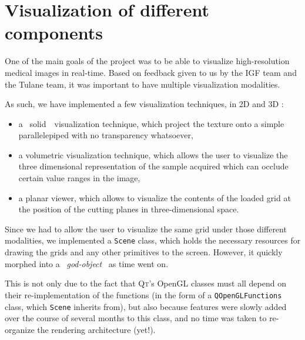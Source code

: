 \section{Visualization of different components}\label{text:03_software_components:02_visualization}
{
	One of the main goals of the project was to be able to visualize high-resolution medical images in real-time. Based on feedback given to us by the IGF team and the Tulane team, it was important to have multiple visualization modalities.\par
	As such, we have implemented a few visualization techniques, in 2D and 3D :\begin{itemize}
		\item a \guillemotleft{}~solid~\guillemotright{}~visualization technique, which project the texture onto a simple parallelepiped with no transparency whatsoever,
		\item a volumetric visualization technique, which allows the user to visualize the three dimensional representation of the sample acquired which can occlude certain value ranges in the image,
		\item a planar viewer, which allows to visualize the contents of the loaded grid at the position of the cutting planes in three-dimensional space.
	\end{itemize}\par
	\myparspace
	Since we had to allow the user to visualize the same grid under those different modalities, we implemented a \texttt{Scene} class, which holds the necessary resources for drawing the grids and any other primitives to the screen. However, it quickly morphed into a \guillemotleft{}~\textit{god-object}\guillemotright{}\footnotemark~ as time went on.\par
	This is not only due to the fact that \textsc{Qt}'s OpenGL classes must all depend on their re-implementation of the functions (in the form of a \texttt{QOpenGLFunctions} class, which \texttt{Scene} inherits from), but also because features were slowly added over the course of several months to this class, and no time was taken to re-organize the rendering architecture (yet!).\par
	\myparspace

}
